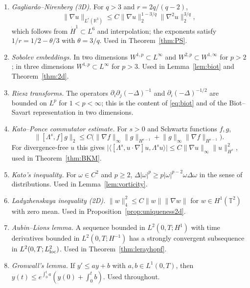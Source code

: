 \documentclass[11pt]{article}
\theoremstyle{remark}
\newcommand{\R}{\mathbb{R}}
\newcommand{\T}{\mathbb{T}}
\newcommand{\norm}[1]{\lVert #1\rVert}
\newcommand{\abs}[1]{\lvert #1\rvert}
\newcommand{\ip}[2]{\langle #1,#2\rangle}
\begin{document}
\begin{enumerate}[label=\textbf{(A.\arabic*)},leftmargin=*]
\item \emph{Gagliardo--Nirenberg (3D).} For $q>3$ and $r=2q/(q-2)$,
\[
\norm{\nabla u}_{L^r(\R^3)}\le C\norm{\nabla u}_{2}^{1-3/q}\norm{\nabla^2u}_{2}^{3/q},
\]
which follows from $\dot H^1\subset L^6$ and interpolation; the exponents satisfy
$1/r=1/2-\theta/3$ with $\theta=3/q$. Used in Theorem~\ref{thm:PS}.

\item \emph{Sobolev embeddings.} In two dimensions $W^{1,p}\subset L^\infty$ and
$W^{2,p}\subset W^{1,\infty}$ for $p>2$; in three dimensions $W^{1,p}\subset L^\infty$ for
$p>3$. Used in Lemma~\ref{lem:biot} and Theorem~\ref{thm:2d}.

\item \emph{Riesz transforms.} The operators $\partial_i\partial_j(-\Delta)^{-1}$ and
$\partial_i(-\Delta)^{-1/2}$ are bounded on $L^p$ for $1<p<\infty$; this is the content of
\eqref{eq:biot} and of the Biot--Savart representation in two dimensions.

\item \emph{Kato--Ponce commutator estimate.} For $s>0$ and Schwartz functions $f,g$,
\[
\norm{[\Lambda^s,f]g}_{2}\le C\bigl(\norm{\nabla f}_{\infty}\norm{g}_{H^{s-1}}
+\norm{g}_{\infty}\norm{\nabla f}_{H^{s-1}}\bigr).
\]
For divergence-free $u$ this gives
$\abs{\ip{[\Lambda^s,u\cdot\nabla]u}{\Lambda^su}}\le C\norm{\nabla u}_\infty
\norm{u}_{H^s}^2$, used in Theorem~\ref{thm:BKM}.

\item \emph{Kato's inequality.} For $\omega\in C^2$ and $p\ge2$,
$\Delta\abs{\omega}^p\ge p\abs{\omega}^{p-2}\omega\Delta\omega$ in the sense of
distributions. Used in Lemma~\ref{lem:vorticity}.

\item \emph{Ladyzhenskaya inequality (2D).} $\norm{w}_{4}^2\le C\norm{w}\norm{\nabla w}$
for $w\in H^1(\T^2)$ with zero mean. Used in Proposition~\ref{prop:uniqueness2d}.

\item \emph{Aubin--Lions lemma.} A sequence bounded in $L^2(0,T;H^1)$ with time derivatives
bounded in $L^2(0,T;H^{-1})$ has a strongly convergent subsequence in $L^2(0,T;L^2_{\rm loc})$.
Used in Theorem~\ref{thm:lerayhopf}.

\item \emph{Gronwall's lemma.} If $y' \le a y+b$ with $a,b\in L^1(0,T)$, then
$y(t)\le e^{\int_0^ta}(y(0)+\int_0^tb)$. Used throughout.
\end{enumerate}
\end{document}
